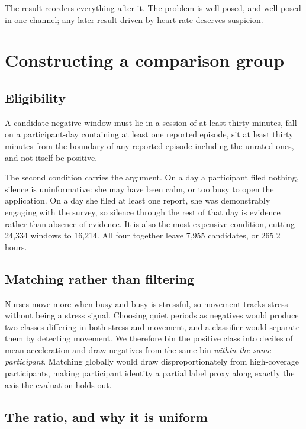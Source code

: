 The result reorders everything after it. The problem is well posed, and well
posed in one channel; any later result driven by heart rate deserves suspicion.

\section{Constructing a comparison group}
\label{sec:negatives}

\subsection{Eligibility}

A candidate negative window must lie in a session of at least thirty minutes,
fall on a participant-day containing at least one reported episode, sit at
least thirty minutes from the boundary of any reported episode including the
unrated ones, and not itself be positive.

The second condition carries the argument. On a day a participant filed
nothing, silence is uninformative: she may have been calm, or too busy to open
the application. On a day she filed at least one report, she was demonstrably
engaging with the survey, so silence through the rest of that day is evidence
rather than absence of evidence. It is also the most expensive condition,
cutting 24{,}334 windows to 16{,}214. All four together leave 7{,}955
candidates, or 265.2 hours.

\subsection{Matching rather than filtering}

Nurses move more when busy and busy is stressful, so movement tracks stress
without being a stress signal. Choosing quiet periods as negatives would
produce two classes differing in both stress and movement, and a classifier
would separate them by detecting movement. We therefore bin the positive class
into deciles of mean acceleration and draw negatives from the same bin
\emph{within the same participant}. Matching globally would draw
disproportionately from high-coverage participants, making participant identity
a partial label proxy along exactly the axis the evaluation holds out.

\subsection{The ratio, and why it is uniform}

